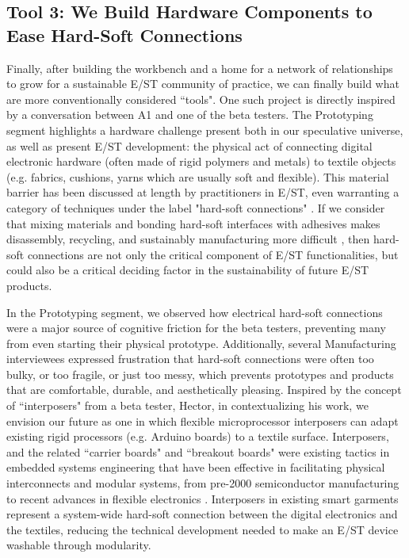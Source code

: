 \documentclass[manuscript,review,anonymous]{acmart}
\begin{document}
\subsection{Tool 3: We Build Hardware Components to Ease Hard-Soft Connections}
Finally, after building the workbench and a home for a network of relationships to grow for a sustainable E/ST community of practice, we can finally build what are more conventionally considered ``tools". One such project is directly inspired by a conversation between A1 and one of the beta testers. The Prototyping segment highlights a hardware challenge present both in our speculative universe, as well as present E/ST development: the physical act of connecting digital electronic hardware (often made of rigid polymers and metals) to textile objects (e.g. fabrics, cushions, yarns which are usually soft and flexible). This material barrier has been discussed at length by practitioners in E/ST, even warranting a category of techniques under the label "hard-soft connections" \cite{kobakant_hardsoft_nodate}.
If we consider that mixing materials and bonding hard-soft interfaces with adhesives makes disassembly, recycling, and sustainably manufacturing more difficult \cite{soh_design_2014, battaia_reverse_2015}
, then hard-soft connections are not only the critical component of E/ST functionalities, but could also be a critical deciding factor in the sustainability of future E/ST products.

In the Prototyping segment, we observed how electrical hard-soft connections were a major source of cognitive friction for the beta testers, preventing many from even starting their physical prototype. Additionally, several Manufacturing interviewees expressed frustration that hard-soft connections were often too bulky, or too fragile, or just too messy, which prevents prototypes and products that are comfortable, durable, and aesthetically pleasing.
Inspired by the concept of ``interposers" from a beta tester, Hector, in contextualizing his work, we envision our future as one in which flexible microprocessor interposers can adapt existing rigid processors (e.g. Arduino boards) to a textile surface. Interposers, and the related ``carrier boards" and ``breakout boards" were existing tactics in embedded systems engineering that have been effective in facilitating physical interconnects and modular systems, from pre-2000 semiconductor manufacturing \cite{semiconductor_khandros_1992} to recent advances in flexible electronics \cite{souriau_wafer_2019, vervust_integration_2012}. Interposers in existing smart garments represent a system-wide hard-soft connection between the digital electronics and the textiles, reducing the technical development needed to make an E/ST device washable through modularity. 
\end{document}
